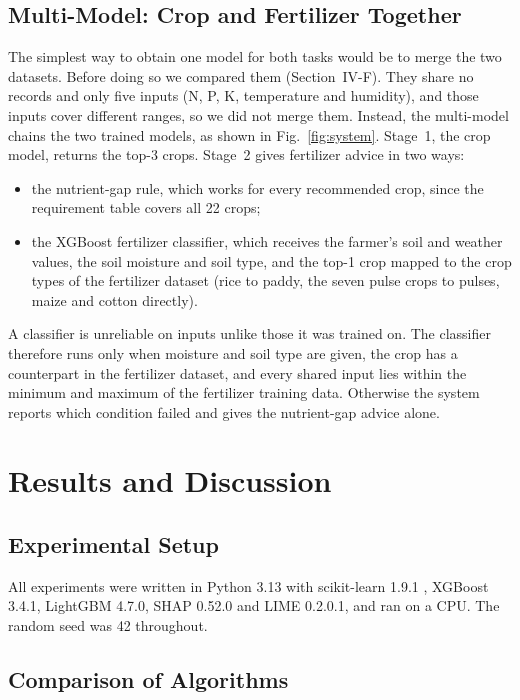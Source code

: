 \documentclass[conference]{IEEEtran}
\begin{document}
\subsection{Multi-Model: Crop and Fertilizer Together}

The simplest way to obtain one model for both tasks would be to merge the two datasets. Before doing so we compared them (Section~IV-F). They share no records and only five inputs (N, P, K, temperature and humidity), and those inputs cover different ranges, so we did not merge them. Instead, the multi-model chains the two trained models, as shown in Fig.~\ref{fig:system}. Stage~1, the crop model, returns the top-3 crops. Stage~2 gives fertilizer advice in two ways:
\begin{itemize}
\item the nutrient-gap rule, which works for every recommended crop, since the requirement table covers all 22 crops;
\item the XGBoost fertilizer classifier, which receives the farmer's soil and weather values, the soil moisture and soil type, and the top-1 crop mapped to the crop types of the fertilizer dataset (rice to paddy, the seven pulse crops to pulses, maize and cotton directly).
\end{itemize}
A classifier is unreliable on inputs unlike those it was trained on. The classifier therefore runs only when moisture and soil type are given, the crop has a counterpart in the fertilizer dataset, and every shared input lies within the minimum and maximum of the fertilizer training data. Otherwise the system reports which condition failed and gives the nutrient-gap advice alone.

\section{Results and Discussion}

\subsection{Experimental Setup}

All experiments were written in Python 3.13 with scikit-learn 1.9.1 \cite{pedregosa2011}, XGBoost 3.4.1, LightGBM 4.7.0, SHAP 0.52.0 and LIME 0.2.0.1, and ran on a CPU. The random seed was 42 throughout.

\subsection{Comparison of Algorithms}
\end{document}
